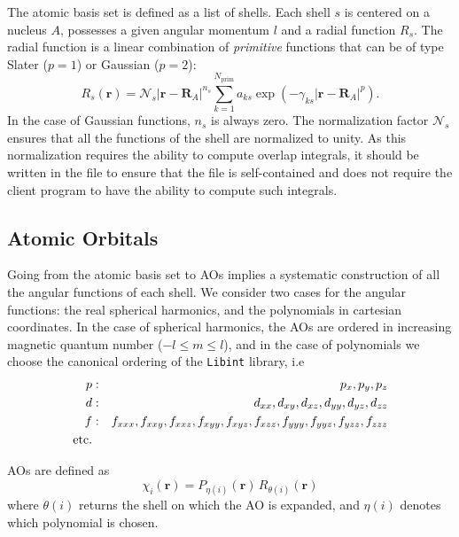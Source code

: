The atomic basis set is defined as a list of shells. Each shell $s$ is
centered on a nucleus $A$, possesses a given angular momentum $l$ and a
radial function $R_s$. The radial function is a linear combination of
\emph{primitive} functions that can be of type Slater ($p=1$)  or
Gaussian ($p=2$):
\[
  R_s(\mathbf{r}) = \mathcal{N}_s |\mathbf{r}-\mathbf{R}_A|^{n_s}
  \sum_{k=1}^{N_{\text{prim}}} a_{ks}
 \exp \left( - \gamma_{ks} 
  |\mathbf{r}-\mathbf{R}_A|^p \right).
\]
In the case of Gaussian functions, $n_s$ is always zero.
The normalization factor $\mathcal{N}_s$ ensures that all the functions
of the shell are normalized to unity. As this normalization requires
the ability to compute overlap integrals, it should be written in the
file to ensure that the file is self-contained and does not require
the client program to have the ability to compute such integrals.

\subsection{Atomic Orbitals}

Going from the atomic basis set to \acp{AO} implies a systematic
construction of all the angular functions of each shell.
We consider two cases for the angular functions: the real spherical
harmonics, and the polynomials in cartesian coordinates.
In the case of spherical harmonics, the \acp{AO} are ordered in
increasing magnetic quantum number ($-l \le m \le l$), and in the case
of polynomials we choose the canonical ordering of the
\texttt{Libint}\cite{Libint2} library, i.e
\begin{eqnarray}
p & : & p_x, p_y, p_z \nonumber \\
d & : & d_{xx}, d_{xy}, d_{xz}, d_{yy}, d_{yz}, d_{zz} \nonumber \\
f & : & f_{xxx}, f_{xxy}, f_{xxz}, f_{xyy}, f_{xyz}, f_{xzz}, f_{yyy}, f_{yyz}, f_{yzz}, f_{zzz} \nonumber \\
{\rm etc.} \nonumber
\end{eqnarray}

\acp{AO} are defined as
\[
  \chi_i (\mathbf{r}) = P_{\eta(i)}(\mathbf{r})\, R_{\theta(i)} (\mathbf{r})
\]
where $\theta(i)$ returns the shell on which the \ac{AO} is expanded,
and $\eta(i)$ denotes which polynomial is chosen.

